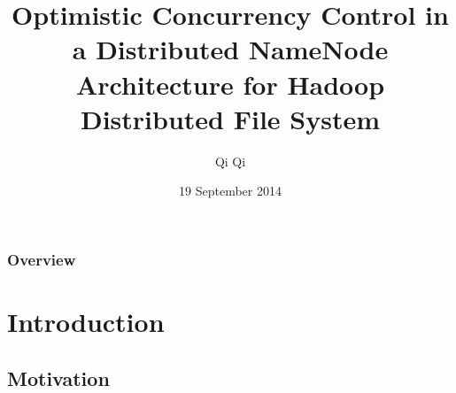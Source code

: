 \documentclass{beamer}
\title[OCC for Hop-HDFS]{Optimistic Concurrency Control in a Distributed NameNode Architecture for Hadoop Distributed File System} %
\author{Qi Qi} %
\institute[IST/KTH/SICS] %
{
Instituto Superior T\'{e}cnico - IST (Portugal) \\ Royal Institute of Technology - KTH (Sweden) \\ 
Swedish Institute of Computer Science - SICS (Sweden) \\%
\medskip
\textit{qiq@kth.se} %
}
\date{19 September 2014} %
\begin{document}
\begin{frame}
\titlepage %
\end{frame}

\begin{frame}
\frametitle{Overview} %
\tableofcontents %
\end{frame}


\section{Introduction} %

\subsection{Motivation} %
\end{document}

